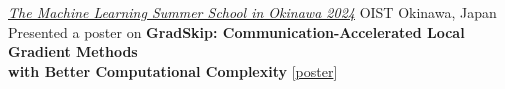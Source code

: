 \documentclass[10pt,a4paper,sans]{moderncv}        %
\newcommand{\kaust}{KAUST}
\newcommand{\yerevan}{Yerevan, Armenia}
\newcommand{\thuwal}{Thuwal, Saudi Arabia}
\newcommand{\ysu}{Yerevan State University}
\begin{document}





  {\textcolor{accent}{\href{https://groups.oist.jp/mlss}{\textit{The Machine Learning Summer School in Okinawa 2024}}}}
  {OIST}
  {Okinawa, Japan}
  {}
  {
    Presented a poster on \textbf{GradSkip: Communication-Accelerated Local Gradient Methods \\ with Better Computational Complexity} [{\href{https://artomaranjyan.github.io/assets/pdf/GradSkip_MLSS_Okinawa.pdf}{poster}}]
  }
\end{document}
